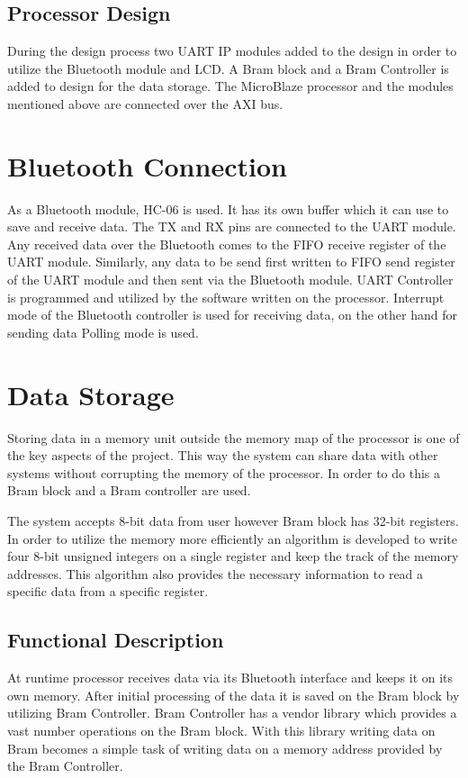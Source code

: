 \subsection{Processor Design}
During the design process two UART IP modules added to the design in order to utilize the Bluetooth module and LCD. A Bram block and a Bram Controller is added to design for the data storage. The MicroBlaze processor and the modules mentioned above are connected over the AXI bus.

\section{Bluetooth Connection} 
As a Bluetooth module, HC-06 is used. It has its own buffer which it can use to save and receive data. The TX and RX pins are connected to the UART module. Any received data over the Bluetooth comes to the FIFO receive register of the UART module. Similarly, any data to be send first written to FIFO send register of the UART module and then sent via the Bluetooth module. UART Controller is programmed and utilized by the software written on the processor. Interrupt mode of the Bluetooth controller is used for receiving data, on the other hand for sending data Polling mode is used.

\section{Data Storage}
Storing data in a memory unit outside the memory map of the processor is one of the key aspects of the project. This way the system can share data with other systems without corrupting the memory of the processor. In order to do this a Bram block and a Bram controller are used.

The system accepts 8-bit data from user however Bram block has 32-bit registers. In order to utilize the memory more efficiently an algorithm is developed to write four 8-bit unsigned integers on a single register and keep the track of the memory addresses. This algorithm also provides the necessary information to read a specific data from a specific register.

\subsection{Functional Description}
At runtime processor receives data via its Bluetooth interface and keeps it on its own memory. After initial processing of the data it is saved on the Bram block by utilizing Bram Controller. Bram Controller has a vendor library which provides a vast number operations on the Bram block. With this library writing data on Bram becomes a simple task of writing data on a memory address provided by the Bram Controller.


